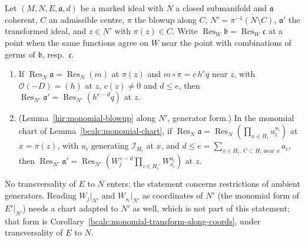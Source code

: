 \begin{theorem}
\label{bcalc:monomial-transform-along}
\mixedleanok
Let \((M,N,E,\mathfrak a,d)\) be a marked ideal with \(N\) a closed submanifold and \(\mathfrak a\) coherent, \(C\) an admissible centre, \(\pi\) the blowup along \(C\),
\(N'=\overline{\pi^{-1}(N\setminus C)}\), \(\mathfrak a'\) the transformed ideal, and \(z\in N'\) with \(\pi(z)\in C\). Write \(\operatorname{Res}_W\mathfrak b=\operatorname{Res}_W\mathfrak c\)
at a point when the same functions agree on \(W\) near the point with combinations of germs of \(\mathfrak b\), resp.\ \(\mathfrak c\).
\begin{enumerate}
\item If \(\operatorname{Res}_N\mathfrak a=\operatorname{Res}_N(m)\) at \(\pi(z)\) and \(m\circ\pi=c\,h^{e}q\) near \(z\), with \(\mathcal O(-D)=(h)\) at \(z\), \(c(z)\ne0\) and \(d\le e\),
then \(\operatorname{Res}_{N'}\mathfrak a'=\operatorname{Res}_{N'}(h^{e-d}q)\) at \(z\).
\item (Lemma~\ref{hir:monomial-blowup} along \(N'\), generator form.) In the monomial chart of Lemma~\ref{bcalc:monomial-chart}, if
\(\operatorname{Res}_N\mathfrak a=\operatorname{Res}_N(\prod_{x\in H_i}u_i^{a_i})\) at \(x=\pi(z)\), with \(u_i\) generating \(\mathcal I_{H_i}\) at \(x\), and
\(d\le e=\sum_{x\in H_i,\ C\subset H_i\text{ near }x}a_i\), then \(\operatorname{Res}_{N'}\mathfrak a'=\operatorname{Res}_{N'}(W_j^{\,e-d}\prod_{z\in H_i'}W_{s_i}^{a_i})\) at \(z\).
\end{enumerate}
No transversality of \(E\) to \(N\) enters: the statement concerns restrictions of ambient generators. Reading \(W_j|_{N'}\) and \(W_{s_i}|_{N'}\)
as coordinates of \(N'\) (the monomial form of \(E'|_{N'}\)) needs a chart adapted to \(N'\) as well, which is not part of this statement; that
form is Corollary~\ref{bcalc:monomial-transform-along-coords}, under transversality of \(E\) to \(N\).
\end{theorem}
